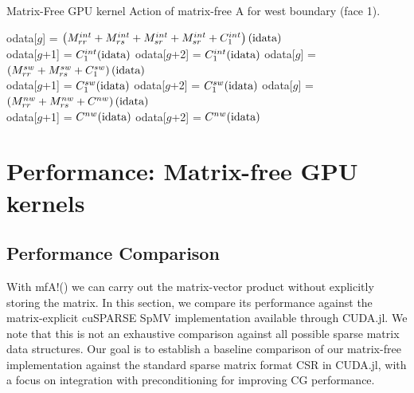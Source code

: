 \setcounter{algorithm}{2}
\begin{algorithm*}
\caption{Matrix-Free GPU kernel Action of matrix-free A for west boundary (face 1).}
\label{alg:mfA-2}
\begin{algorithmic}
 
\State odata[$g$] = $\left(M_{rr}^{int} + M_{rs}^{int} + M_{sr}^{int} + M_{sr}^{int} + C_1^{int}\right)(\textnormal{idata})$ \\ 
\State  odata[$g$+1] = $C_1^{int}(\textnormal{idata})$
\State odata[$g$+2] = $C_1^{int}(\textnormal{idata})$
\EndIf
{} 
\State odata[$g$] = $\left(M_{rr}^{sw} + M_{rs}^{sw} + C_1^{sw}\right)(\textnormal{idata})$ \\ 
\State  odata[$g$+1] = $C_1^{sw}(\textnormal{idata})$
\State odata[$g$+2] = $C_1^{sw}(\textnormal{idata})$
\EndIf
{}
\State odata[$g$] = $\left(M_{rr}^{nw} + M_{rs}^{nw} + C^{nw}\right)(\textnormal{idata})$ \\ 
\State odata[$g$+1] = $C^{nw}(\textnormal{idata})$
\State odata[$g$+2] = $C^{nw}(\textnormal{idata})$
\EndIf
\end{algorithmic}
\end{algorithm*}



\section{Performance: Matrix-free GPU kernels}
\subsection{Performance Comparison}\label{sec: comparison}
With {\ttfamily mfA!}() we can carry out the matrix-vector product without explicitly storing the matrix. In this section, we compare its performance against the matrix-explicit cuSPARSE SpMV implementation available through CUDA.jl. We note that this is not an exhaustive comparison against all possible sparse matrix data structures.  Our goal is to establish a baseline comparison of our matrix-free implementation against the standard sparse matrix format CSR in CUDA.jl, with a focus on integration with preconditioning for improving CG performance.  





